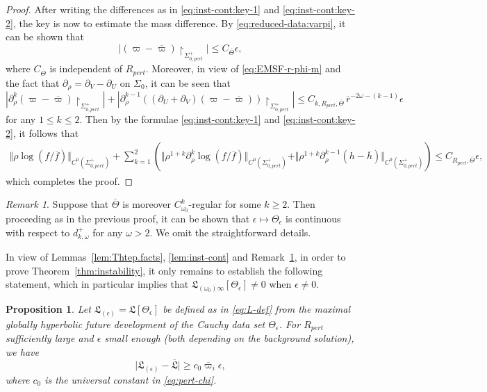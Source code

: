 \documentclass[10pt, reqno]{amsart}
\newtheorem{proposition}[theorem]{Proposition}
\theoremstyle{definition}
\theoremstyle{remark}
\newtheorem{remark}[theorem]{Remark}
\theoremstyle{conjecture}
\numberwithin{equation}{section}
\newcommand{\nrm}[1]{\Vert#1\Vert}
\newcommand{\abs}[1]{\vert#1\vert}
\newcommand{\rd}{\partial}
\newcommand{\0}{\emptyset}
\newcommand{\eps}{\epsilon}
\newcommand{\Sgm}{\Sigma}
\newcommand{\Tht}{\Theta}
\newcommand{\omg}{\omega}
\newcommand{\rbg}{\overline{r}}					%
\newcommand{\varpibg}{\overline{\varpi}}				%
\newcommand{\fbg}{\overline{f}}
\newcommand{\hbg}{\overline{h}}
\newcommand{\Abs}[1]{\left\vert #1 \right\vert}
\begin{document}
\begin{proof}
After writing the differences as in \eqref{eq:inst-cont:key-1} and \eqref{eq:inst-cont:key-2}, the key is now to estimate the mass difference. By \eqref{eq:reduced-data:varpi}, it can be shown that
\begin{equation*}
	\Abs{(\varpi - \varpibg) \restriction_{\Sgm_{0, pert}^{+}}}
	\leq C_{\overline{\Tht}} \eps,
\end{equation*}
where $C_{\overline{\Tht}}$ is independent of $R_{pert}$. Moreover, in view of \eqref{eq:EMSF-r-phi-m} and the fact that $\rd_{\rho} = \rd_{V} - \rd_{U}$ on $\Sgm_{0}$, it can be seen that
\begin{equation*}
	\Abs{\rd_{\rho}^{k}  (\varpi - \varpibg) \restriction_{\Sgm_{0, pert}^{+}}} 
	+ \Abs{\rd_{\rho}^{k-1}  \left( (\rd_{U} + \rd_{V}) (\varpi - \varpibg) \right)\restriction_{\Sgm_{0, pert}^{+}}}
	\leq C_{k, R_{pert}, \overline{\Tht}} \, \rbg^{- 2 \omg - (k - 1)} \eps
\end{equation*}
for any $1 \leq k \leq 2$. Then by the formulae \eqref{eq:inst-cont:key-1} and \eqref{eq:inst-cont:key-2}, it follows that
\begin{equation*}
\begin{split}
\nrm{\rho \log(f/ \fbg)}_{C^{0}(\Sgm_{0, pert}^{+})}  + \sum_{k=1}^{2} \left( \nrm{\rho^{1+k} \rd_{\rho}^{k} \log(f/ \fbg)}_{C^{0}(\Sgm_{0, pert}^{+})}
					+ \nrm{\rho^{1+k} \rd_{\rho}^{k-1} (h - \hbg)}_{C^{0}(\Sgm_{0, pert}^{+})} \right) 
			 \leq C_{R_{pert}, \overline{\Tht}} \eps,
\end{split}
\end{equation*}
which completes the proof. \qedhere
\end{proof}
\begin{remark}\label{rem:inst-high-reg}
Suppose that $\overline{\Tht}$ is moreover $C^{k}_{\omg_0}$-regular for some $k \geq 2$. Then proceeding as in the previous proof, it can be shown that $\eps \mapsto \Tht_{\eps}$ is continuous with respect to $d^{+}_{k, \omg}$ for any $\omg > 2$. We omit the straightforward details.
\end{remark}
In view of Lemmas~\ref{lem:Thtep.facts}, \ref{lem:inst-cont} and Remark~\ref{rem:inst-high-reg}, in order to prove Theorem~\ref{thm:instability}, it only remains to establish the following statement, which in particular implies that $\mathfrak{L}_{(\omg_0)\infty}[\Tht_\eps]\neq 0$ when $\eps \neq 0$.
\begin{proposition} \label{prop:inst-key}
Let $\mathfrak{L}_{(\eps)}=\mathfrak{L}[\Tht_\eps]$ be defined as in \eqref{eq:L-def} from the maximal globally hyperbolic future development of the Cauchy data set $\Tht_{\eps}$. For $R_{pert}$ sufficiently large and $\eps$ small enough (both depending on the background solution), we have
\begin{equation} \label{eq:inst-key}
\abs{\mathfrak{L}_{(\eps)} - \overline{\mathfrak{L}}} \geq c_{0} \varpibg_{i} \eps ,
\end{equation}
where $c_{0}$ is the universal constant in \eqref{eq:pert-chi}.
\end{proposition}
\end{document}
